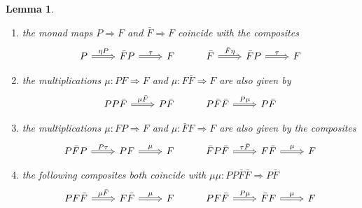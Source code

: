 \documentclass[a4paper,10pt
,draft
]{article}%
\numberwithin{equation}{section}
\numberwithin{figure}{section}
\newtheorem{lemma}[equation]{Lemma}%
\theoremstyle{definition} %
\newcommand{\1}{\ensuremath{\mathbbm 1}}%
\begin{document}
\begin{lemma}\label{MODSTRCOMRE LEM}
\begin{enumerate}[label=(\roman*)]
\item the monad maps
$P \Rightarrow F$ and 
$\bar{F} \Rightarrow F$ coincide with the composites
\[
\begin{tikzcd}
	P \ar[Rightarrow]{r}{\eta P} &
	\bar{F} P \ar[Rightarrow]{r}{\tau} &
	F 
&
	\bar{F} \ar[Rightarrow]{r}{\bar{F} \eta} &
	\bar{F} P \ar[Rightarrow]{r}{\tau} &
	F 
\end{tikzcd}
\]
\item
the multiplications $\mu \colon PF \Rightarrow F$ and
$\mu \colon F\bar{F} \Rightarrow F$
are also given by
\[
\begin{tikzcd}
	PP\bar{F} \ar[Rightarrow]{r}{\mu \bar{F}} &
	P \bar{F} 
&
	P \bar{F} \bar{F} \ar[Rightarrow]{r}{P \mu} &
	P \bar{F} 
\end{tikzcd}
\]
\item
the multiplications
$\mu \colon F P \Rightarrow F$ and
$\mu \colon \bar{F} F \Rightarrow F$ are also given by the composites
\[
\begin{tikzcd}
	P\bar{F} P \ar[Rightarrow]{r}{P \tau} &
	P F \ar[Rightarrow]{r}{\mu} &
	F 
&
	\bar{F} P \bar{F} \ar[Rightarrow]{r}{\tau \bar{F}} &
	F \bar{F} \ar[Rightarrow]{r}{\mu} &
	F  
\end{tikzcd}
\]
\item the following composites both coincide with $\mu\mu \colon PP\bar{F}\bar{F} \Rightarrow P \bar{F}$
\[
\begin{tikzcd}
	P F \bar{F} \ar[Rightarrow]{r}{\mu \bar{F}} &
	F \bar{F} \ar[Rightarrow]{r}{\mu} &
	F 
&
	P F \bar{F} \ar[Rightarrow]{r}{P \mu} &
	\bar{F} F \ar[Rightarrow]{r}{\mu} &
	F 
\end{tikzcd}
\]
\end{enumerate}
\end{lemma}
\end{document}
